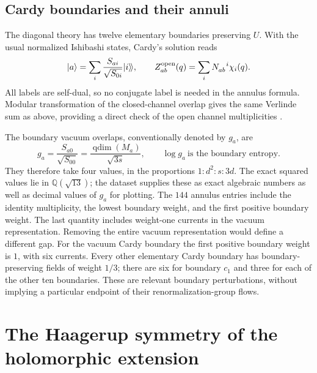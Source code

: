 \documentclass[11pt,a4paper]{article}
\theoremstyle{definition}
\begin{document}
\subsection{Cardy boundaries and their annuli}

The diagonal theory has twelve elementary boundaries preserving $U$.
With the usual normalized Ishibashi states, Cardy's solution reads
\begin{equation}
 |a\rangle=\sum_i\frac{S_{ai}}{\sqrt{S_{0i}}}|i\rangle\!\rangle,
 \qquad
 Z_{ab}^{\rm open}(q)=\sum_iN_{ab}^{\phantom{ab}i}\chi_i(q).
 \label{eq:physics-Cardy}
\end{equation}
All labels are self-dual, so no conjugate label is needed in the annulus
formula. Modular transformation of the closed-channel overlap gives
the same Verlinde sum as above, providing a direct check of the open
channel multiplicities \cite{Cardy}.

The boundary vacuum overlaps, conventionally denoted by $g_a$, are
\begin{equation}
 g_a=\frac{S_{a0}}{\sqrt{S_{00}}}
     =\frac{\operatorname{qdim}(M_a)}{\sqrt{3s}},
 \qquad \log g_a\ \text{is the boundary entropy}.
 \label{eq:physics-g}
\end{equation}
They therefore take four values, in the proportions
$1:d^2:s:3d$. The exact squared values lie in $\mathbb Q(\sqrt{13})$;
the dataset supplies these as exact algebraic numbers as well as
decimal values of $g_a$ for plotting. The $144$ annulus entries include
the identity multiplicity, the lowest boundary weight, and the first
positive boundary weight. The last quantity includes weight-one
currents in the vacuum representation. Removing the entire vacuum
representation would define a different gap.
For the vacuum Cardy boundary the first positive boundary weight is
$1$, with six currents. Every other elementary Cardy boundary has
boundary-preserving fields of weight $1/3$; there are six for boundary
$c_1$ and three for each of the other ten boundaries. These are relevant
boundary perturbations, without implying a particular endpoint of
their renormalization-group flows.

\section{The Haagerup symmetry of the holomorphic extension}
\label{sec:physics-H3}
\end{document}
